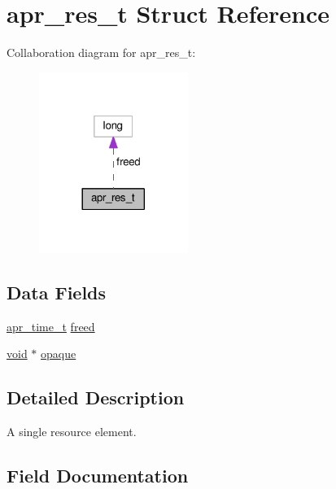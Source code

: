\hypertarget{structapr__res__t}{}\section{apr\+\_\+res\+\_\+t Struct Reference}
\label{structapr__res__t}


Collaboration diagram for apr\+\_\+res\+\_\+t\+:
\nopagebreak
\begin{figure}[H]
\begin{center}
\leavevmode
\includegraphics[width=137pt]{structapr__res__t__coll__graph}
\end{center}
\end{figure}
\subsection*{Data Fields}
\begin{DoxyCompactItemize}
\item 
\hyperlink{group__apr__time_gadb4bde16055748190eae190c55aa02bb}{apr\+\_\+time\+\_\+t} \hyperlink{structapr__res__t_a366c15b84ded7493eba8eb0d47a90412}{freed}
\item 
\hyperlink{group__MOD__ISAPI_gacd6cdbf73df3d9eed42fa493d9b621a6}{void} $\ast$ \hyperlink{structapr__res__t_a45f937d8bf156f3241fa44e6138bf1f4}{opaque}
\end{DoxyCompactItemize}


\subsection{Detailed Description}
A single resource element. 

\subsection{Field Documentation}
